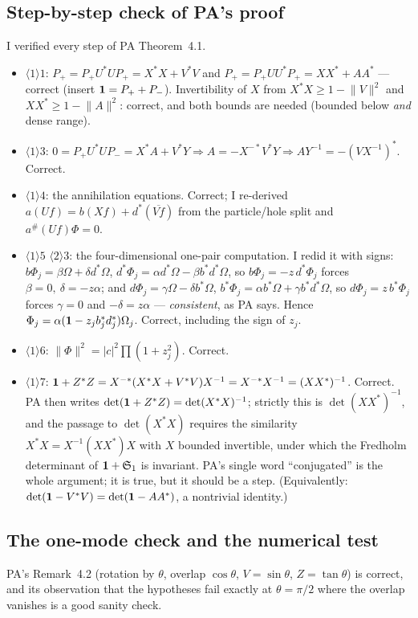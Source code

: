 \documentclass[11pt]{article}
\newcommand{\Pp}{P_+}\newcommand{\Pm}{P_-}
\providecommand{\Om}{\Omega}\providecommand{\Gm}{\Gamma}\providecommand{\Qt}{\widetilde Q}
\providecommand{\norm}[1]{\lVert #1\rVert}\providecommand{\abs}[1]{\lvert #1\rvert}
\begin{document}
\subsection{Step-by-step check of PA's proof}
I verified every step of PA Theorem~4.1.
\begin{itemize}[leftmargin=1.4em]
\item $\langle1\rangle1$: $\Pp=\Pp U^*U\Pp=X^*X+V^*V$ and $\Pp=\Pp UU^*\Pp=XX^*+AA^*$ --- correct
 (insert $\one=\Pp+\Pm$).  Invertibility of $X$ from $X^*X\ge1-\norm V^2$ and $XX^*\ge1-\norm A^2$:
 correct, and both bounds are needed (bounded below \emph{and} dense range).
\item $\langle1\rangle3$: $0=\Pp U^*U\Pm=X^*A+V^*Y\Rightarrow A=-X^{-*}V^*Y\Rightarrow
 AY^{-1}=-(VX^{-1})^*$.  Correct.
\item $\langle1\rangle4$: the annihilation equations.  Correct; I re-derived
 $a(Uf)=b(Xf)+d^*(\overline{Vf})$ from the particle/hole split and $a^{\#}(Uf)\Phi=0$.
\item $\langle1\rangle5$ $\langle2\rangle3$: the four-dimensional one-pair computation.  I redid it
 with signs: $b\Phi_j=\beta\Om+\delta d^*\Om$, $d^*\Phi_j=\alpha d^*\Om-\beta b^*d^*\Om$, so
 $b\Phi_j=-z\,d^*\Phi_j$ forces $\beta=0,\ \delta=-z\alpha$; and $d\Phi_j=\gamma\Om-\delta b^*\Om$,
 $b^*\Phi_j=\alpha b^*\Om+\gamma b^*d^*\Om$, so $d\Phi_j=z\,b^*\Phi_j$ forces $\gamma=0$ and
 $-\delta=z\alpha$ --- \emph{consistent}, as PA says.  Hence
 $\Phi_j=\alpha(\one-z_jb_j^*d_j^*)\Om_j$.  Correct, including the sign of $z_j$.
\item $\langle1\rangle6$: $\norm\Phi^2=|c|^2\prod(1+z_j^2)$.  Correct.
\item $\langle1\rangle7$: $\mathbf 1+Z^*Z=X^{-*}(X^*X+V^*V)X^{-1}=X^{-*}X^{-1}=(XX^*)^{-1}$.  Correct.
 PA then writes $\det(\mathbf 1+Z^*Z)=\det(X^*X)^{-1}$; strictly this is
 $\det(XX^*)^{-1}$, and the passage to $\det(X^*X)$ requires the similarity
 $X^*X=X^{-1}(XX^*)X$ with $X$ bounded invertible, under which the Fredholm determinant of
 $\mathbf 1+\mathfrak S_1$ is invariant.  PA's single word ``conjugated'' is the whole argument; it is true, but
 it should be a step.  (Equivalently: $\det(\mathbf 1-V^*V)=\det(\mathbf 1-AA^*)$, a nontrivial identity.)
\end{itemize}

\subsection{The one-mode check and the numerical test}
PA's Remark~4.2 (rotation by $\theta$, overlap $\cos\theta$, $V=\sin\theta$, $Z=\tan\theta$) is
correct, and its observation that the hypotheses fail exactly at $\theta=\pi/2$ where the overlap
vanishes is a good sanity check.
\end{document}
